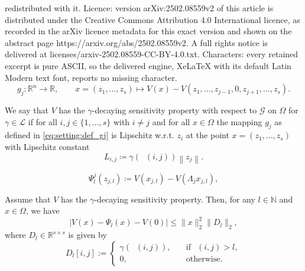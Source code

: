 \documentclass[10pt,a4paper]{amsart}
\DeclareMathOperator{\distG}{\operatorname{dist_\mathcal{G}}} %
\def\N{\mathbb{N}}
\newcommand{\G}{\mathcal{G}}
\newcommand{\Rn}{\R^n}
\newcommand{\R}{\mathbb{R}}
\newcommand{\agents}{\lbrace 1, \dots, s \rbrace}
\newcommand{\norm}[1]{\left\lVert {#1} \right\rVert}
\renewcommand{\L}{\mathcal{L}}
\begin{document}
redistributed with it. Licence: version arXiv:2502.08559v2 of this article is distributed under the Creative Commons Attribution 4.0 International licence, as recorded in the arXiv licence metadata for this exact version and shown on the abstract page https://arxiv.org/abs/2502.08559v2. A full rights notice is delivered at licenses/arxiv-2502.08559-CC-BY-4.0.txt. Characters: every retained excerpt is pure ASCII, so the delivered engine, XeLaTeX with its default Latin Modern text font, reports no missing character.
    \begin{equation} \label{eq:setting:def_gj}
        g_j \colon \Rn \to \R , \qquad 
        x = (z_1, \dots, z_s) \mapsto V(x) - V(z_1, \dots, z_{j-1}, 0, z_{j+1}, \dots, z_s).
    \end{equation}

\begin{definition} \label{def:setting:sensitivity}
   We say that $V$ has the $\gamma$-decaying sensitivity property with respect to $\G$ on $\Omega$ for $\gamma \in \L$ if for all $i, j \in \agents$ with $i \neq j$ and for all $x \in \Omega$ the mapping $g_j$ as defined in \eqref{eq:setting:def_gj} is Lipschitz w.r.t. $z_i$ at the point $x = (z_1, \dots, z_s)$ with Lipschitz constant
    \begin{equation} \label{eq:def_Lipschitz}
        L_{i,j} \coloneqq \gamma (\distG(i,j)) \norm{z_j}. 
    \end{equation}
\end{definition}

\begin{equation} \label{eq:SepApprox:DefPsij}
    \Psi_l^j(z_{j,l}) \coloneqq V(x_{j,l}) - V(\Lambda_j x_{j,l}), 
\end{equation}

\begin{lemma} \label{lem:SepApprox:QuadraticEstimate}
     Assume that $V$ has the $\gamma$-decaying sensitivity property. Then, for any $l \in \N$ and $x \in \Omega$, we have 
    \begin{equation*}
        \lvert V(x) - \Psi_l(x) - V(0) \rvert \leq \lVert x \rVert_2^2 \lVert D_l \rVert_2, 
    \end{equation*}
    where $D_l \in \R^{s \times s}$ is given by 
    \begin{equation}\label{def.D}
        D_l[i,j] := \begin{cases}
        \gamma({\distG(i,j)}), \quad & \text{if} \, \distG(i,j) > l, \\
       0, \quad & \text{otherwise}. 
    \end{cases}
    \end{equation}
\end{lemma}
\end{document}
